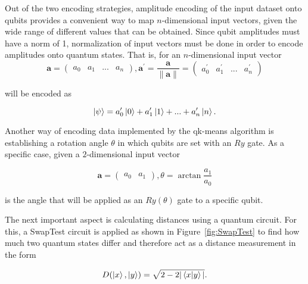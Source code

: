 \documentclass[conference]{IEEEtran}
\begin{document}
Out of the two encoding strategies, amplitude encoding of the input dataset onto qubits provides a convenient way to map \(n\)-dimensional input vectors, given the wide range of different values that can be obtained. Since qubit amplitudes must have a norm of 1, normalization of input vectors must be done in order to encode amplitudes onto quantum states.
That is, for an \(n\)-dimensional input vector 
$$
\mathbf{a} =\begin{pmatrix} a_0 & a_1 & ... & a_n \end{pmatrix}, \mathbf{a}^\prime = \frac{\mathbf{a}}{\left\lVert \mathbf{a}\right\rVert} = \begin{pmatrix} a^\prime_0 & a^\prime_1 & ... & a^\prime_n \end{pmatrix}
$$

will be encoded as 

$$
\ket{\psi} = a^\prime_0\ket{0} + a^\prime_1\ket{1} + ... + a^\prime_n\ket{n}.
$$

Another way of encoding data implemented by the qk-means algorithm is establishing a rotation angle \(\theta\) in which qubits are set with an \(Ry\) gate. As a specific case, given a \(2\)-dimensional input vector

$$
\mathbf{a} =\begin{pmatrix} a_0 & a_1 \end{pmatrix}, \theta = \arctan{\frac{a_1}{a_0}}
$$

is the angle that will be applied as an \(Ry(\theta)\) gate to a specific qubit.

The next important aspect is calculating distances using a quantum circuit. For this, a SwapTest circuit is applied as shown in Figure~\ref{fig:SwapTest} to find how much two quantum states differ and therefore act as a distance measurement in the form

$$
D(\ket{x},\ket{y}) = \sqrt{2-2|\braket{x|y}|}.
$$
\end{document}
